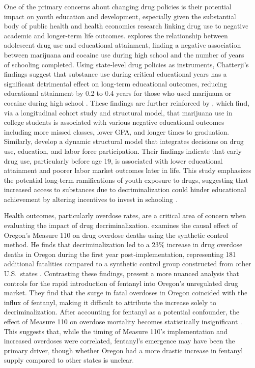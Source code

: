 \documentclass[12pt]{article}
\begin{document}
One of the primary concerns about changing drug policies is their potential
impact on youth education and development, especially given the substantial
body of public health and health economics research linking drug use to
negative academic and longer-term life outcomes. 
explores the relationship between adolescent drug use and educational
attainment, finding a negative association between marijuana and cocaine
use during high school and the number of years of schooling completed.
Using state-level drug policies as instruments, Chatterji's findings
suggest that substance use during critical educational years has a
significant detrimental effect on long-term educational outcomes, reducing
educational attainment by 0.2 to 0.4 years for those who used marijuana or
cocaine during high school \cite{chatterji2003illicit}. These findings are
further reinforced by , which find, via a
longitudinal cohort study and structural model, that marijuana use in
college students is associated with various negative educational outcomes
including more missed classes, lower GPA, and longer times to graduation.
Similarly,  develop a dynamic structural model that
integrates decisions on drug use, education, and labor force participation.
Their findings indicate that early drug use, particularly before age 19, is
associated with lower educational attainment and poorer labor market
outcomes later in life. This study emphasizes the potential long-term
ramifications of youth exposure to drugs, suggesting that increased access
to substances due to decriminalization could hinder educational achievement
by altering incentives to invest in schooling \cite{mezza2021drug}.

Health outcomes, particularly overdose rates, are a critical area of
concern when evaluating the impact of drug decriminalization.
 examines the causal effect of Oregon's Measure 110 on
drug overdose deaths using the synthetic control method. He finds that
decriminalization led to a 23\% increase in drug overdose deaths in Oregon
during the first year post-implementation, representing 181 additional
fatalities compared to a synthetic control group constructed from other
U.S.\ states \cite{spencer2023does}. Contrasting these findings,
 present a more nuanced analysis that controls for the
rapid introduction of fentanyl into Oregon's unregulated drug market. They
find that the surge in fatal overdoses in Oregon coincided with the influx
of fentanyl, making it difficult to attribute the increase solely to
decriminalization. After accounting for fentanyl as a potential confounder,
the effect of Measure 110 on overdose mortality becomes statistically
insignificant \cite{zoorob2024drug}. This suggests that, while the timing
of Measure 110's implementation and increased overdoses were correlated,
fentanyl's emergence may have been the primary driver, though whether
Oregon had a more drastic increase in fentanyl supply compared to other
states is unclear.
\end{document}
